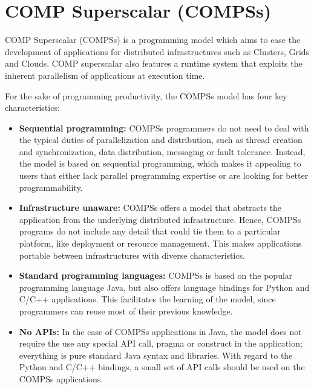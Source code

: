 \section{COMP Superscalar (COMPSs)}
\label{sec:Introduction}

COMP Superscalar (COMPSs) is a programming model which aims to ease the 
development of applications for distributed infrastructures such as Clusters, 
Grids and Clouds. COMP superscalar also features a runtime system that exploits 
the inherent parallelism of applications at execution time.

For the sake of programming productivity, the COMPSs model has four key 
characteristics:

\begin{itemize}
 
 \item  {\bf Sequential programming:} COMPSs programmers do not need to deal 
 with the typical duties of parallelization and distribution, such as thread 
 creation and synchronization, data distribution, messaging or fault tolerance. 
 Instead, the model is based on sequential programming, which makes it appealing 
 to users that either lack parallel programming expertise or are looking for 
 better programmability.
 
 \item  {\bf Infrastructure unaware:} COMPSs offers a model that abstracts the 
 application from the underlying distributed infrastructure. Hence, COMPSs 
 programs do not include any detail that could tie them to a particular 
 platform, like deployment or resource management. This makes applications 
 portable between infrastructures with diverse characteristics.
 
 \item  {\bf Standard programming languages:} COMPSs is based on the popular 
 programming language Java, but also offers language bindings for Python and 
 C/C++ applications. This facilitates the learning of the model, since 
 programmers can reuse most of their previous knowledge.
 
 \item  {\bf No APIs:} In the case of COMPSs applications in Java, the model 
 does not require the use any special API call, pragma or construct in the 
 application; everything is pure standard Java syntax and libraries. With 
 regard to the Python and C/C++ bindings, a small set of API calls should be used 
 on the COMPSs applications.

\end{itemize}

